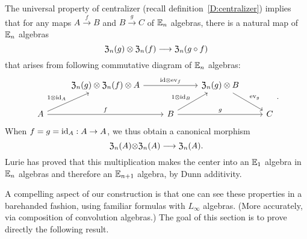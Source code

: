 \documentclass[11pt]{amsart}
\numberwithin{equation}{section}
\begin{document}
The universal property of centralizer (recall definition~\ref{D:centralizer}) implies that 
for any maps $A\stackrel{f}\to B$ and $B\stackrel{g}\to C$ of $\mathbb E_n$ algebras, 
there is a natural map of $\mathbb E_n$ algebras
\begin{equation}
\label{eqdef:canonicaltocentralizers} 
{\frak Z}_n(g) \otimes {\frak Z}_n(f) \longrightarrow {\frak Z}_n(g\circ f)
\end{equation}
that arises from following commutative diagram of $\mathbb E_n$ algebras:
\[
\begin{tikzcd}
&   {\frak Z}_n(g) \otimes  {\frak Z}_n(f) \otimes A \arrow[rr, "\id\otimes \ev_f"] &&  {\frak Z}_n(g) \otimes  B \arrow[dr, "\ev_g"]\\
A \arrow[ur, "1\otimes \id_A"] \arrow[rr, "f"] && B \arrow[rr, "g"] \arrow[ur, "1\otimes \id_B"] && C 
\end{tikzcd}.
\]
When $f=g={\rm id}_A:A\to A$, we thus obtain a canonical morphism 
\begin{equation} 
\label{eq:dgAssofcenter}
{\frak Z}_n(A){\otimes} {\frak Z}_n(A) \longrightarrow {\frak Z}_n(A).
\end{equation}
Lurie \cite{HA} has proved that this multiplication makes the center into an $\mathbb E_1$ algebra in $\mathbb E_n$ algebras 
and therefore an $\mathbb E_{n+1}$ algebra, by Dunn additivity. 
%

A compelling aspect of our construction is that one can see these properties in a barehanded fashion,
using familiar formulas with $L_\infty$ algebras.
(More accurately, via composition of convolution algebras.)
The goal of this section is to prove directly the following result.
\end{document}
